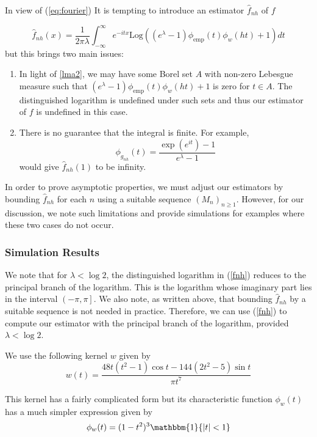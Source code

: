 \documentclass[a4paper,11pt]{article}
\theoremstyle{theorem}
\theoremstyle{definition}
\theoremstyle{remark}
\begin{document}
In view of (\ref{eq:fourier}) It is tempting to introduce an estimator $\hat{f}_{nh}$ of $f$

\begin{equation} \label{fnh}
\hat{f}_{nh}(x)= \frac{1}{2\pi\lambda}\int_{-\infty}^{\infty}{e^{-itx}\text{Log}\left((e^{\lambda} - 1)\phi_{\text{emp}}(t)\phi_{w}(ht) + 1\right)}dt
\end{equation}
but this brings two main issues:
\begin{enumerate}
\item In light of \cref{lma2}, we may have some Borel set $A$ with non-zero Lebesgue measure such that $(e^{\lambda} - 1)\phi_{\text{emp}}(t)\phi_{w}(ht) + 1$ is zero for $ t \in A$. The distinguished logarithm is undefined under such sets and thus our estimator of $f$ is undefined in this case.
\item There is no guarantee that the integral is finite. For example,
\[
\phi_{g_{nh}}(t) = \frac{\exp(e^{it}) - 1}{e^{\lambda} - 1}
\]
would give $\hat{f}_{nh}(1)$ to be infinity.
\end{enumerate}

In order to prove asymptotic properties, we must adjust our estimators by bounding $\hat{f}_{nh}$ for each $n$ using a suitable sequence $(M_{n})_{n \geq 1}$. However, for our discussion, we note such limitations and provide simulations for examples where these two cases do not occur.

\subsubsection{Simulation Results}

We note that for $\lambda < \log2$, the distinguished logarithm in (\ref{fnh}) reduces to the principal branch of the logarithm. This is the logarithm whose imaginary part lies in the interval $\left(-\pi, \pi\right]$. We also note, as written above, that bounding $\hat{f}_{nh}$ by a suitable sequence is not needed in practice. Therefore, we can use (\ref{fnh}) to compute our estimator with the principal branch of the logarithm, provided $\lambda < \log 2$.

We use the following kernel $w$ given by
\[
w(t) = \frac{48t(t^{2} - 1)\cos t - 144(2t^{2} - 5)\sin t}{\pi t^{7}}
\]

This kernel has a fairly complicated form but its characteristic function $\phi_{w}(t)$ has a much simpler expression given by
\[
\phi_{w}(t) = (1 - t^{2})^{3}\mathbbm{1}\{|t| < 1\}
\]
\end{document}
